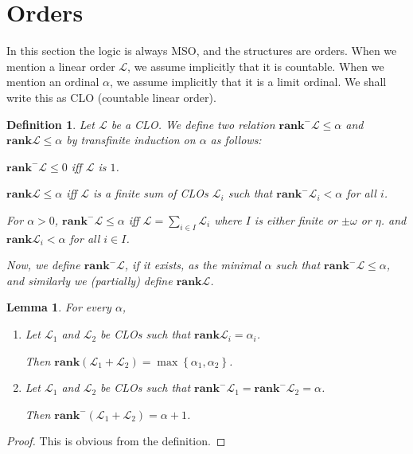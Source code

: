 \documentclass{article}
\newtheorem{lemma}{Lemma}
\newtheorem{definition}{Definition}
\newcommand{\parens}[1]{\left( {#1} \right)}
\newcommand{\braces}[1]{\left\{ {#1} \right\}}
\newcommand{\setcomp}[1]{\braces{#1}}
\newcommand{\rankm}{\mathbf{rank^-}}
\newcommand{\rankp}{\mathbf{rank}}
\newcommand{\LL}{\mathcal{L}}
\begin{document}
\section{Orders}

In this section the logic is always MSO, and the structures are orders.
When we mention a linear order $\LL$, we assume implicitly that it is countable.
When we mention an ordinal $\alpha$, we assume implicitly that it is a limit ordinal.
We shall write this as CLO (countable linear order).

\begin{definition}
    Let $\LL$ be a CLO.
    We define two relation $\rankm \LL \le \alpha$ and $\rankp \LL \le \alpha$
    by transfinite induction on $\alpha$ as follows:

    $\rankm \LL \le 0$ iff $\LL$ is $1$.

    $\rankp \LL \le \alpha$ iff $\LL$ is a finite sum of CLOs $\LL_i$ such that
    $\rankm \LL_i < \alpha$ for all $i$.

    For $\alpha>0$, $\rankm \LL \le \alpha$ iff $\LL = \sum_{i \in I} \LL_i$
    where $I$ is either finite or $\pm \omega$ or $\eta$.
    and $\rankp \LL_i < \alpha$ for all $i \in I$.

    Now, we define $\rankm \LL$, if it exists, as the minimal $\alpha$
    such that $\rankm \LL \le \alpha$, and similarly we (partially) define
    $\rankp \LL$.
\end{definition}

\begin{lemma}
    For every $\alpha$,
        \begin{enumerate}
            \item
            Let $\LL_1$ and $\LL_2$ be CLOs such that $\rankp \LL_i = \alpha_i$.

            Then $\rankp \parens{\LL_1 + \LL_2} = \max \setcomp{\alpha_1, \alpha_2}$.
            \item
            Let $\LL_1$ and $\LL_2$ be CLOs such that $\rankm \LL_1 = \rankm \LL_2 = \alpha$.

            Then $\rankm \parens{\LL_1 + \LL_2} = \alpha + 1$.
        \end{enumerate}
\end{lemma}

\begin{proof}
    This is obvious from the definition.
\end{proof}
\end{document}
